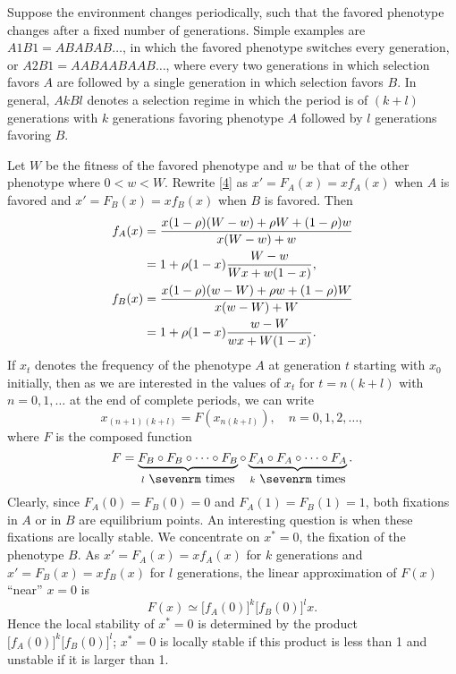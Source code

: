 \documentclass[9pt,twocolumn,twoside,lineno]{pnas-new}
\newcommand{\an}[1]{\begin{align}#1\end{align}}
\begin{document}
 Suppose the environment changes periodically, such that the favored phenotype changes after a fixed number of generations. Simple examples are $A1B1=ABABAB\dots$, in which the favored phenotype switches every generation, or $A2B1=AABAABAAB\dots$, where every two generations in which selection favors $A$ are followed by a single generation in which selection favors $B$.
  In general, $AkBl$ denotes a selection regime in which the period is of $(k+l)$ generations with $k$ generations favoring phenotype $A$ followed by $l$ generations favoring $B$.
 
Let $W$ be the fitness of the favored phenotype and $w$ be that of the other phenotype where $0<w<W$. Rewrite \eqref{4} as $x'=F_A(x)=xf_A(x)$ when $A$ is favored and $x'=F_B(x)=xf_B(x)$ when $B$ is favored. Then
 \begin{equation}
 \an{
f_A(x) &= {x(1-\rho)(W-w) +\rho W +(1-\rho)w\over x(W-w) +w}\\
&= 1+\rho(1-x){W-w\over Wx +w(1-x)},\\
f_B(x) &= {x(1-\rho)(w-W) +\rho w +(1-\rho)W\over x(w-W) +W} \\
&= 1+\rho(1-x){w-W\over wx+W(1-x)}.
}\label{8}\end{equation}
  \noindent If $x_t$ denotes the frequency of  the phenotype $A$ at generation $t$ starting with $x_0$ initially, then as we are interested in the values of $x_t$ for $t=n(k+l)$ with $n=0,1,\dots$ at the end of complete periods, we can write
 \begin{equation}x_{(n+1)(k+l)}=F(x_{n(k+l)}),\quad n=0,1,2,\dots,\label{9}\end{equation}
  where $F$ is the composed function
\begin{equation}F=\underbrace{F_B\circ F_B \circ\cdots\circ F_B}_{l\ \hbox{\sevenrm times}} \circ\underbrace{F_A\circ F_A \circ\cdots\circ F_A}_{k\ \hbox{\sevenrm times}}.\label{10}\end{equation}
  Clearly, since $F_A(0) =F_B(0) =0$ and $F_A(1) =F_B(1) =1$, both fixations in $A$ or in $B$ are equilibrium points. An interesting question is when these fixations are locally stable. We concentrate on $x^*=0$, the fixation of the phenotype $B$. As $x'=F_A(x) =xf_A(x)$ for $k$ generations and $x'=F_B(x) =xf_B(x)$ for $l$ generations, the linear approximation of $F(x)$ ``near'' $x=0$ is
 \begin{equation}F(x) \simeq\bigl[f_A(0)\bigr]^k \bigl[f_B(0)\bigr]^lx.\label{11}\end{equation}
   Hence the local stability of $x^*=0$ is determined by the product $\bigl[f_A(0)\bigr]^k \bigl[f_B(0)\bigr]^l$;  $x^*=0$  is locally stable if this product  is less than 1 and unstable if it is larger than 1.
   
\end{document}
